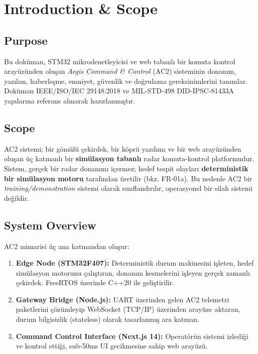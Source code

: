 \section{Introduction \& Scope}

\subsection{Purpose}
Bu doküman, STM32 mikrodenetleyicisi ve web tabanlı bir komuta kontrol arayüzünden oluşan \textit{Aegis Command \& Control} (AC2) sisteminin donanım, yazılım, haberleşme, emniyet, güvenlik ve doğrulama gereksinimlerini tanımlar. Doküman IEEE/ISO/IEC 29148:2018 ve MIL-STD-498 DID-IPSC-81433A yapılarına referans alınarak hazırlanmıştır.

\subsection{Scope}
AC2 sistemi; bir gömülü çekirdek, bir köprü yazılımı ve bir web arayüzünden oluşan üç katmanlı bir \textbf{simülasyon tabanlı} radar komuta-kontrol platformudur. Sistem, gerçek bir radar donanımı içermez; hedef tespit olayları \textbf{deterministik bir simülasyon motoru} tarafından üretilir (bkz. FR-01a). Bu nedenle AC2 bir \textit{training/demonstration} sistemi olarak sınıflandırılır, operasyonel bir silah sistemi değildir.

\subsection{System Overview}
AC2 mimarisi üç ana katmandan oluşur:
\begin{enumerate}[1.]
    \item \textbf{Edge Node (STM32F407):} Deterministik durum makinesini işleten, hedef simülasyon motorunu çalıştıran, donanım kesmelerini işleyen gerçek zamanlı çekirdek. FreeRTOS üzerinde C++20 ile geliştirilir.
    \item \textbf{Gateway Bridge (Node.js):} UART üzerinden gelen AC2 telemetri paketlerini çözümleyip WebSocket (TCP/IP) üzerinden arayüze aktaran, durum bilgisizlik (stateless) olarak tasarlanmış ara katman.
    \item \textbf{Command Control Interface (Next.js 14):} Operatörün sistemi izlediği ve kontrol ettiği, sub-50ms UI gecikmesine sahip web arayüzü.
\end{enumerate}

